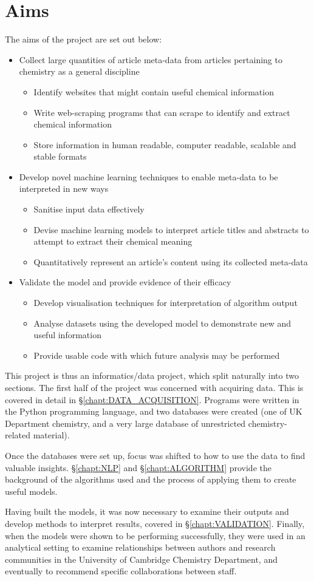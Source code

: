 \section{Aims}
The aims of the project are set out below:
\begin{itemize}
\item Collect large quantities of article meta-data from articles pertaining to chemistry as a general discipline
\begin{itemize}
\item Identify websites that might contain useful chemical information
\item Write web-scraping programs that can scrape to identify and extract chemical information
\item Store information in human readable, computer readable, scalable and stable formats
\end{itemize}
\item Develop novel machine learning techniques to enable meta-data to be interpreted in new ways
\begin{itemize}
\itemsep0em 
\item Sanitise input data effectively
\item Devise  machine learning models to interpret article titles and abstracts to attempt to extract their chemical meaning
\item Quantitatively represent an article's content using its collected meta-data
\end{itemize}
\item Validate the model and provide evidence of their efficacy
\begin{itemize}
\item Develop visualisation techniques for interpretation of algorithm output
\item Analyse datasets using the developed model to demonstrate new and useful information
\item Provide usable code with which future analysis may be performed
\end{itemize}
\end{itemize}
This project is thus an informatics/data project, which split naturally into two sections. The first half of the project was concerned with acquiring data. This is covered in detail in \S\ref{chapt:DATA_ACQUISITION}.
Programs were written in the Python programming language, and two databases were created (one of UK Department chemistry, and a very large database of unrestricted chemistry-related material).

Once the databases were set up, focus was shifted to how to use the data to find valuable insights. \S\ref{chapt:NLP} and \S\ref{chapt:ALGORITHM} provide the background of the algorithms used and the process of applying them to create useful models. 

Having built the models, it was now necessary to examine their outputs and develop methods to interpret results, covered in \S\ref{chapt:VALIDATION}. Finally, when the models were shown to be performing successfully, they were used in an analytical setting to examine relationships between authors and research communities in the University of Cambridge Chemistry Department, and eventually to recommend specific collaborations between staff.